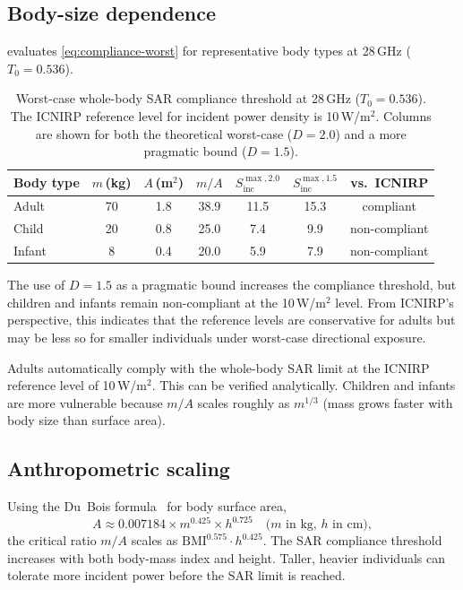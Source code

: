 \documentclass[11pt,a4paper]{article}
\theoremstyle{definition}      %
\newcommand{\Sinc}{S_{\mathrm{inc}}}
\begin{document}
\subsection{Body-size dependence}\label{sec:body-size}

 evaluates \cref{eq:compliance-worst} for
representative body types at 28\,GHz ($T_0=0.536$).

\begin{table}[!htbp]
\centering
\caption{Worst-case whole-body SAR compliance threshold at 28\,GHz ($T_0=0.536$).
  The ICNIRP reference level for incident power density is 10\,W/m$^2$.
  Columns are shown for both the theoretical worst-case ($D=2.0$) and a
  more pragmatic bound ($D=1.5$).}\label{tab:compliance}
\begin{tabular}{lcccccc}
\toprule
Body type & $m$\,(kg) & $A$\,(m$^2$) & $m/A$ & $\Sinc^{\max, 2.0}$ & $\Sinc^{\max, 1.5}$ & vs.\ ICNIRP \\
\midrule
Adult     & 70  & 1.8 & 38.9 & 11.5 & 15.3 & compliant \\
Child     & 20  & 0.8 & 25.0 & 7.4  & \phantom{0}9.9  & non-compliant \\
Infant    &  8  & 0.4 & 20.0 & 5.9  & \phantom{0}7.9  & non-compliant \\
\bottomrule
\end{tabular}
\end{table}

The use of $D=1.5$ as a pragmatic bound increases the compliance threshold, but children and infants remain non-compliant at the 10\,W/m$^2$ level.
From ICNIRP's perspective, this indicates that the reference levels are conservative for adults but may be less so for smaller individuals under worst-case directional exposure.

Adults automatically comply with the whole-body SAR limit at the
ICNIRP reference level of 10\,W/m$^2$. This can be verified
analytically. Children and infants are more vulnerable because $m/A$
scales roughly as $m^{1/3}$ (mass grows faster with body size than
surface area).

\subsection{Anthropometric scaling}\label{sec:anthropometric}

Using the Du~Bois formula~\cite{DuBois1916} for body surface area,
\begin{equation}\label{eq:DuBois}
  A \approx 0.007184\times m^{0.425}\times h^{0.725}
  \quad\text{($m$ in kg, $h$ in cm)},
\end{equation}
the critical ratio $m/A$ scales as
$\mathrm{BMI}^{0.575}\cdot h^{0.425}$.  The SAR compliance threshold
increases with both body-mass index and height. Taller, heavier
individuals can tolerate more incident power before the SAR limit is
reached.
\end{document}
